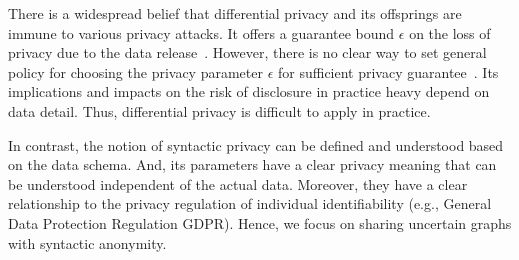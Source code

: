 There is a widespread belief that differential privacy and its offsprings are immune to various privacy attacks. It offers a guarantee bound $\epsilon$ on the loss of privacy due to the data release~\cite{Sala_Sharing_2011,Xiao_Differentially_2014}. However, there is no clear way to set general policy for choosing the privacy parameter $\epsilon$ for sufficient privacy guarantee~\cite{lee2011}. Its implications and impacts on the risk of disclosure in practice heavy depend on data detail. Thus, differential privacy is difficult to apply in practice. 

In contrast, the notion of syntactic privacy can be defined and understood based on the data schema. And, its parameters have a clear privacy meaning that can be understood independent of the actual data. Moreover, they have a clear relationship to the privacy regulation of individual identifiability (e.g., General Data Protection Regulation GDPR). 
Hence, we focus on sharing uncertain graphs with syntactic anonymity. 